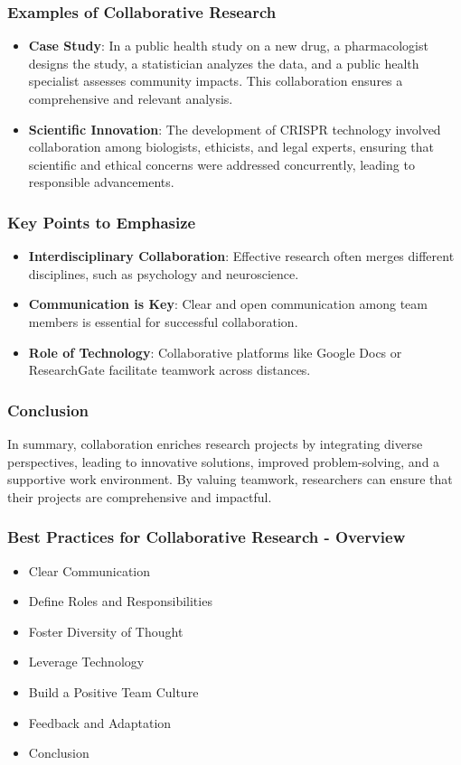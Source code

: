 \documentclass[aspectratio=169]{beamer}
\begin{document}
\begin{frame}[fragile]
    \frametitle{Examples of Collaborative Research}
    \begin{itemize}
        \item \textbf{Case Study}: In a public health study on a new drug, a pharmacologist designs the study, a statistician analyzes the data, and a public health specialist assesses community impacts. This collaboration ensures a comprehensive and relevant analysis.
        
        \item \textbf{Scientific Innovation}: The development of CRISPR technology involved collaboration among biologists, ethicists, and legal experts, ensuring that scientific and ethical concerns were addressed concurrently, leading to responsible advancements.
    \end{itemize}
\end{frame}

\begin{frame}[fragile]
    \frametitle{Key Points to Emphasize}
    \begin{itemize}
        \item \textbf{Interdisciplinary Collaboration}: Effective research often merges different disciplines, such as psychology and neuroscience.
        \item \textbf{Communication is Key}: Clear and open communication among team members is essential for successful collaboration.
        \item \textbf{Role of Technology}: Collaborative platforms like Google Docs or ResearchGate facilitate teamwork across distances.
    \end{itemize}
\end{frame}

\begin{frame}[fragile]
    \frametitle{Conclusion}
    In summary, collaboration enriches research projects by integrating diverse perspectives, leading to innovative solutions, improved problem-solving, and a supportive work environment. By valuing teamwork, researchers can ensure that their projects are comprehensive and impactful.
\end{frame}

\begin{frame}[fragile]
    \frametitle{Best Practices for Collaborative Research - Overview}
    \begin{itemize}
        \item Clear Communication
        \item Define Roles and Responsibilities
        \item Foster Diversity of Thought
        \item Leverage Technology
        \item Build a Positive Team Culture
        \item Feedback and Adaptation
        \item Conclusion
    \end{itemize}
\end{frame}
\end{document}
